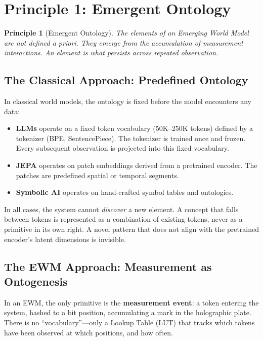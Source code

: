 \documentclass[11pt,a4paper]{article}
\newtheorem{principle}{Principle}[section]
\theoremstyle{remark}
\begin{document}
\section{Principle 1: Emergent Ontology}
\label{sec:emergence}

\begin{principle}[Emergent Ontology]
\label{prin:emergence}
The elements of an Emerging World Model are not defined a priori. They emerge from
the accumulation of measurement interactions. An element is \textit{what persists}
across repeated observation.
\end{principle}

\subsection{The Classical Approach: Predefined Ontology}

In classical world models, the ontology is fixed before the model encounters any data:
\begin{itemize}[leftmargin=*,nosep]
  \item \textbf{LLMs} operate on a fixed token vocabulary (50K--250K tokens) defined by
    a tokenizer (BPE, SentencePiece). The tokenizer is trained once and frozen. Every
    subsequent observation is projected into this fixed vocabulary.
  \item \textbf{JEPA} operates on patch embeddings derived from a pretrained encoder.
    The patches are predefined spatial or temporal segments.
  \item \textbf{Symbolic AI} operates on hand-crafted symbol tables and ontologies.
\end{itemize}

In all cases, the system cannot \textit{discover} a new element. A concept that falls
between tokens is represented as a combination of existing tokens, never as a primitive
in its own right. A novel pattern that does not align with the pretrained encoder's
latent dimensions is invisible.

\subsection{The EWM Approach: Measurement as Ontogenesis}

In an EWM, the only primitive is the \textbf{measurement event}: a token entering the
system, hashed to a bit position, accumulating a mark in the holographic plate. There is
no ``vocabulary''---only a Lookup Table (LUT) that tracks which tokens have been observed
at which positions, and how often.
\end{document}
